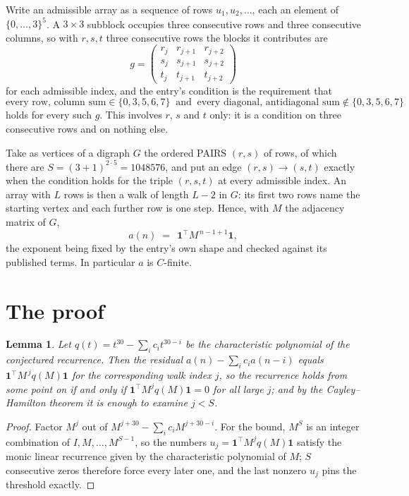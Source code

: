 \documentclass[11pt,a4paper]{article}
\theoremstyle{plain}
\newtheorem{lemma}[theorem]{Lemma}
\theoremstyle{definition}
\begin{document}
Write an admissible array as a sequence of rows $u_1,u_2,\dots$, each an element of
$\{0,\dots,3\}^{5}$. A $3\times3$ subblock occupies three consecutive rows and
three consecutive columns, so with $r,s,t$ three consecutive rows the blocks it
contributes are
\[
g=\begin{pmatrix}r_j&r_{j+1}&r_{j+2}\\ s_j&s_{j+1}&s_{j+2}\\ t_j&t_{j+1}&t_{j+2}\end{pmatrix}
\]
for each admissible index, and the entry's condition is the requirement that
\[
\text{every row, column sum} \in \{0,3,5,6,7\}\ \text{ and }\ \text{every diagonal, antidiagonal sum} \notin \{0,3,5,6,7\}
\]
holds for every such $g$. This involves $r$, $s$ and $t$ only: it is a condition on
three consecutive rows and on nothing else.

Take as vertices of a digraph $G$ the ordered PAIRS $(r,s)$ of rows, of which there are
$S=(3+1)^{2\cdot5}=1048576$, and put an edge $(r,s)\to(s,t)$ exactly when the condition
holds for the triple $(r,s,t)$ at every admissible index. An array with $L$ rows is then a
walk of length $L-2$ in $G$: its first two rows name the starting vertex and each further
row is one step. Hence, with $M$ the adjacency matrix of $G$,
\[
a(n)\;=\;\,\mathbf{1}^{\!\top}M^{\,n-1+1}\mathbf{1},
\]
the exponent being fixed by the entry's own shape and checked against its published terms.
In particular $a$ is $C$-finite.

\section{The proof}

\begin{lemma}\label{lem:crit}
Let $q(t)=t^{30}-\sum_i c_it^{30-i}$ be the characteristic polynomial of the
conjectured recurrence. Then the residual $a(n)-\sum_ic_ia(n-i)$ equals
$\mathbf{1}^{\!\top}M^{\,j}q(M)\mathbf{1}$ for the corresponding walk index
$j$, so the recurrence holds from some point on if and only if
$\mathbf{1}^{\!\top}M^{j}q(M)\mathbf{1}=0$ for all large $j$; and by the
Cayley--Hamilton theorem it is enough to examine $j<S$.
\end{lemma}

\begin{proof}
Factor $M^{j}$ out of $M^{j+30}-\sum_ic_iM^{j+30-i}$. For the bound, $M^{S}$
is an integer combination of $I,M,\dots,M^{S-1}$, so the numbers
$u_j=\mathbf{1}^{\!\top}M^{j}q(M)\mathbf{1}$ satisfy the monic linear recurrence given by
the characteristic polynomial of $M$; $S$ consecutive zeros therefore force every later one,
and the last nonzero $u_j$ pins the threshold exactly.
\end{proof}
\end{document}
